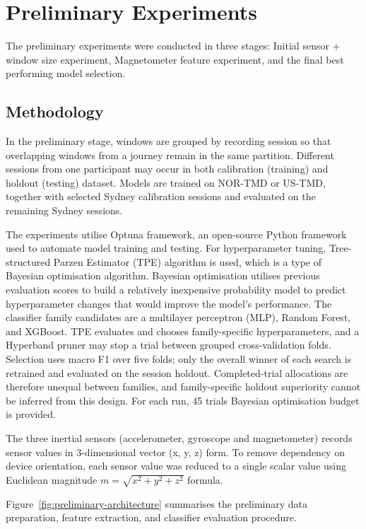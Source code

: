 
\section{Preliminary Experiments}

The preliminary experiments were conducted in three stages: Initial sensor + window size experiment, Magnetometer feature experiment, and the final best performing model selection.

\subsection{Methodology}

In the preliminary stage, windows are grouped by recording session so that overlapping windows from a journey remain in the same partition. Different sessions from one participant may occur in both calibration (training) and holdout (testing) dataset. Models are trained on NOR-TMD or US-TMD, together with selected Sydney calibration sessions and evaluated on the remaining Sydney sessions.

The experiments utilise Optuna framework, an open-source Python framework used to automate model training and testing. For hyperparameter tuning, Tree-structured Parzen Estimator (TPE) algorithm is used, which is a type of Bayesian optimisation algorithm. Bayesian optimisation utilises previous evaluation scores to build a relatively inexpensive probability model to predict hyperparameter changes that would improve the model's performance. The classifier family candidates are a multilayer perceptron (MLP), Random Forest, and XGBoost. TPE evaluates and chooses family-specific hyperparameters, and a Hyperband pruner may stop a trial between grouped cross-validation folds. Selection uses macro F1 over five folds; only the overall winner of each search is retrained and evaluated on the session holdout. Completed-trial allocations are therefore unequal between families, and family-specific holdout superiority cannot be inferred from this design. For each run, 45 trials Bayesian optimisation budget is provided.

The three inertial sensors (accelerometer, gyroscope and magnetometer) records sensor values in 3-dimensional vector (x, y, z) form. To remove dependency on device orientation, each sensor value was reduced to a single scalar value using Euclidean magnitude $m=\sqrt{x^2+y^2+z^2}$ formula.

Figure~\ref{fig:preliminary-architecture} summarises the preliminary data preparation, feature extraction, and classifier evaluation procedure.

